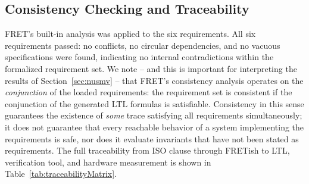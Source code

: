 \documentclass{ieeeaccess}
\theoremstyle{definition}
\begin{document}
\subsection{Consistency Checking and Traceability}
\label{sec:fret_consistency}
FRET's built-in analysis was applied to the six requirements. All six requirements passed: no conflicts, no circular dependencies, and no vacuous specifications were found, indicating no internal contradictions within the formalized requirement set. We note -- and this is important for interpreting the results of Section~\ref{sec:nusmv} -- that FRET's consistency analysis operates on the \emph{conjunction} of the loaded requirements: the requirement set is consistent if the conjunction of the generated LTL formulas is satisfiable. Consistency in this sense guarantees the existence of \emph{some} trace satisfying all requirements simultaneously; it does not guarantee that every reachable behavior of a system implementing the requirements is safe, nor does it evaluate invariants that have not been stated as requirements. The full traceability from ISO clause through FRETish to LTL, verification tool, and hardware measurement is shown in Table~\ref{tab:traceabilityMatrix}.
\end{document}
